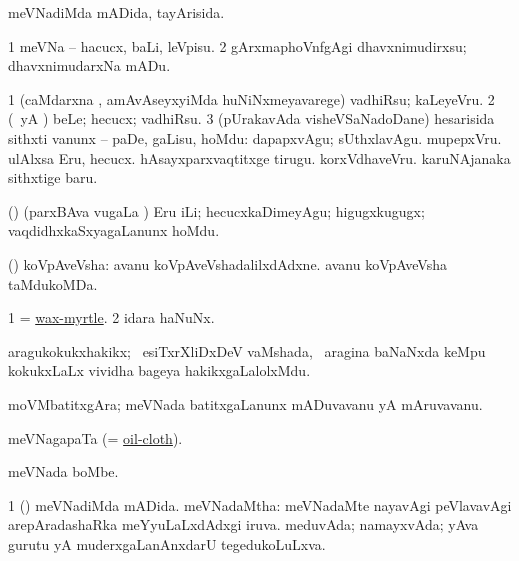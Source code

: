 \bentry
{}
\gl{\gu}
\expl{}
\bmng
meVNadiMda mADida, tayArisida. 
\emng
\eentry

\bentry
{}
\gl{\sakirx}
\expl{}
\bmng
\bnum
\num{1} meVNa -- hacucx, baLi, leVpisu. 
\num{2} gArxmaphoVnfgAgi dhavxnimudirxsu; dhavxnimudarxNa mADu. 
\enum
\emng
\eentry

\bentry
{}
\gl{\akirx}
\expl{}
\bmng
\bnum
\num{1} (caMdarxna \vi, amAvAseyxyiMda huNiNxmeyavarege) vadhiRsu; kaLeyeVru. 
\num{2} (\pArxparx\ yA \kAparx) beLe; hecucx; vadhiRsu. 
\num{3} (pUrakavAda visheVSaNadoDane) hesarisida sithxti \mo vanunx -- paDe, gaLisu, hoMdu:  dapapxvAgu; sUthxlavAgu.  mupepxVru.  ulAlxsa Eru, hecucx.  hAsayxparxvaqtitxge tirugu.  korxVdhaveVru.  karuNAjanaka sithxtige baru. 
\enum
\emng

\noindent 
\gl{\pagu}
\expl{}
\bmng
{} (\rUpa) (parxBAva \mo vugaLa \vi) Eru iLi; hecucxkaDimeyAgu; higugxkugugx; vaqdidhxkaSxyagaLanunx hoMdu. 
\emng
\eentry

\bentry
{}
\gl{\nA}
\expl{}
\bmng
(\ashi) koVpAveVsha:  avanu koVpAveVshadalilxdAdxne.  avanu koVpAveVsha taMdukoMDa. 
\emng
\eentry

\bentry
{} 
\gl{\nA}
\bmng
\bnum
\num{1} = \hyperlink{wax-myrtle}{wax-myrtle}. 
\num{2} idara haNuNx. 
\enum
\emng
\eentry

\bentry
{} 
\gl{\nA}
\expl{}
\bmng
aragukokukxhakikx; \kanmu\ esiTxrXliDxDeV vaMshada, \sA\ aragina baNaNxda keMpu kokukxLaLx vividha bageya hakikxgaLalolxMdu. 
\emng
\eentry

\bentry
{} 
\gl{\nA}
\expl{}
\bmng
moVMbatitxgAra; meVNada batitxgaLanunx mADuvavanu yA mAruvavanu. 
\emng
\eentry

\bentry
{} 
\gl{\nA}
\expl{}
\bmng
meVNagapaTa (= \hyperref{kandict_o.pdf}{O}{oilcloth}{oil-cloth}). 
\emng
\eentry

\bentry
{} 
\gl{\nA}
\expl{}
\bmng
meVNada boMbe. 
\emng
\eentry

\bentry
{} 
\gl{\gu}
\expl{}
\bmng
\bnum
\num{1} (\pArxparx) meVNadiMda mADida. 
 meVNadaMtha: 
\banum
{} meVNadaMte nayavAgi peVlavavAgi arepAradashaRka meYyuLaLxdAdxgi iruva. 
 meduvAda; namayxvAda; yAva gurutu yA muderxgaLanAnxdarU tegedukoLuLxva. 
\eanum
\numie
\enum
\emng
\eentry


